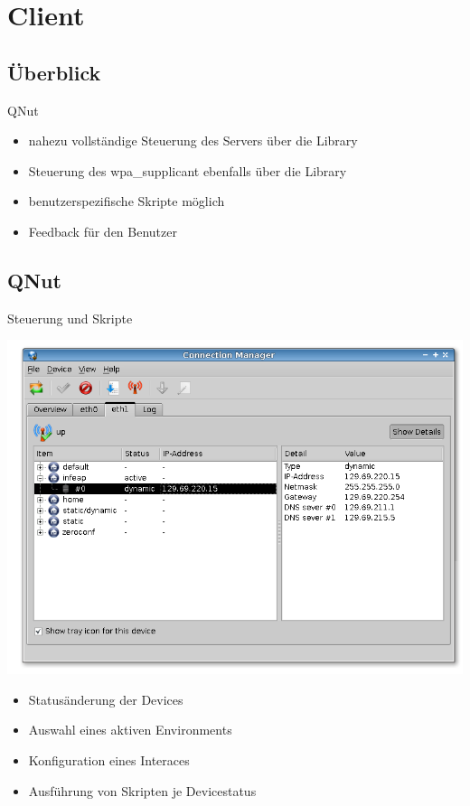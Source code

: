 
\section{Client}
\subsection{Überblick}
\begin{frame}[<+-| alert@+>]{QNut}
	\begin{itemize}
		\item nahezu vollständige Steuerung des Servers über die Library
		\item Steuerung des wpa\_supplicant ebenfalls über die Library
		\item benutzerspezifische Skripte möglich
		\item Feedback für den Benutzer
	\end{itemize}
\end{frame}


\subsection{QNut}

\begin{frame}[<+-| alert@+>]{Steuerung und Skripte}

		\includegraphics[scale=0.25]{qnut_detailed.png}

	\begin{itemize}
		\item Statusänderung der Devices
		\item Auswahl eines aktiven Environments
		\item Konfiguration eines Interaces
		\item Ausführung von Skripten je Devicestatus
	\end{itemize}
\end{frame}

